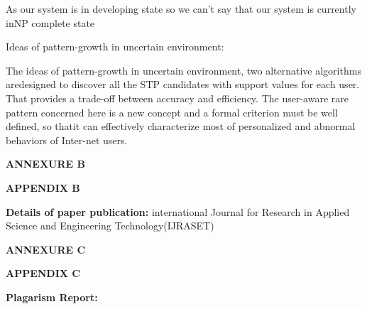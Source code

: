 \documentclass[12pt]{report}
\begin{document}
As our system is in developing state so we can’t say that our system is currently inNP
complete state

Ideas of pattern-growth in uncertain environment:

The ideas of pattern-growth in uncertain environment, two alternative algorithms aredesigned to 
discover all the STP candidates with support values for each user. That provides a trade-off 
between accuracy and efficiency. The user-aware rare pattern concerned here is a new concept 
and a formal criterion must be well defined, so thatit can effectively characterize most of
personalized and abnormal behaviors of Inter-net users.



\vspace{1cm}




\centering
\Large\textbf{ANNEXURE B}

\centering

\Large\textbf{APPENDIX B}\\
\justifying
\setlength{\parindent}{4em}
\setlength{\parskip}{0.5em}
\renewcommand{\baselinestretch}{1.5}
\normalsize
\raggedright\textbf{Details of paper publication:} international Journal for Research in Applied Science and Engineering Technology(IJRASET)

\vspace{1cm}


\vspace{0.1cm} 






\vspace{15 cm}

\clearpage


\centering
\Large\textbf{ANNEXURE C}

\centering

\Large\textbf{APPENDIX C}\\
\justifying
\setlength{\parindent}{4em}
\setlength{\parskip}{0.5em}
\renewcommand{\baselinestretch}{1.5}
\large
\raggedright\textbf{Plagarism Report:}
\vspace{1cm}
\end{document}
